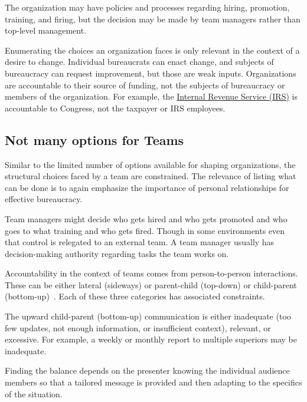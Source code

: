 The organization may have policies and processes regarding hiring, promotion, training, and firing, but the decision may be made by team managers rather than top-level management. 

Enumerating the choices an organization faces is only relevant in the context of a desire to change. 
Individual bureaucrats can enact change, and subjects of bureaucracy can request improvement, but those are weak inputs. 
Organizations are accountable to their source of funding, not the subjects of bureaucracy or members of the organization. For example, the \href{https://en.wikipedia.org/wiki/Internal_Revenue_Service}{Internal Revenue Service (IRS)} 
%
is accountable to Congress, not the taxpayer or IRS employees. 

\subsection*{Not many options for Teams}

Similar to the limited number of options available for shaping organizations, the structural choices faced by a team are constrained. The relevance of listing what can be done is to again emphasize the importance of personal relationships for effective bureaucracy. 

Team managers might decide who gets hired and who gets promoted and who goes to what training and who gets fired. Though in some environments even that control is relegated to an external team. A team manager usually has decision-making authority regarding tasks the team works on. 

Accountability in the context of teams comes from person-to-person interactions. These can be either lateral (sideways) or parent-child (top-down) or child-parent (bottom-up)~\cite{2014_Jorgensen}. Each of these three categories has associated constraints.

The upward child-parent (bottom-up) communication is either inadequate (too few updates, not enough information, or insufficient context), relevant, or excessive. For example, a weekly or monthly report to multiple superiors may be inadequate. 

Finding the balance depends on the presenter knowing the individual audience members so that a tailored message is provided and then adapting to the specifics of the situation. 

